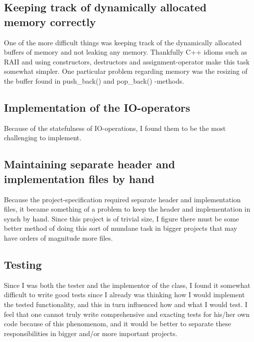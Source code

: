 \documentclass[11pt]{article}
\begin{document}
\subsection{Keeping track of dynamically allocated memory correctly}

One of the more difficult things was keeping track of the dynamically
allocated buffers of memory and not leaking any memory. Thankfully C++
idioms such as RAII and using constructors, destructors and
assignment-operator make this task somewhat simpler. One particular
problem regarding memory was the resizing of the buffer found in
push\_back() and pop\_back() -methods.

\subsection{Implementation of the IO-operators}

Because of the statefulness of IO-operations, I found them to be the
most challenging to implement. 

\subsection{Maintaining separate header and implementation files by hand}

Because the project-specification required separate header and
implementation files, it became something of a problem to keep the
header and implementation in synch by hand. Since this project is of
trivial size, I figure there must be some better method of doing this
sort of mundane task in bigger projects that may have orders of
magnitude more files. 

\subsection{Testing}

Since I was both the tester and the implementor of the class, I found
it somewhat difficult to write good tests since I already was thinking
how I would implement the tested functionality, and this in turn
influenced how and what I would test. I feel that one cannot truly
write comprehensive and exacting tests for his/her own code because of
this phenomenom, and it would be better to separate these
responsibilities in bigger and/or more important projects.
\end{document}
